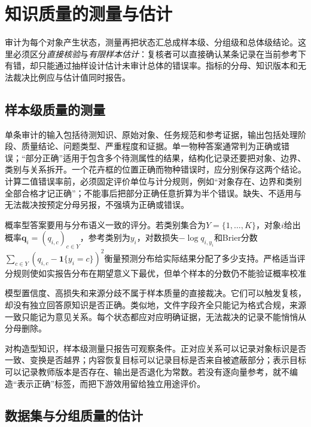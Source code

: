\section{知识质量的测量与估计}
\label{sec:knowledge-quality-assessment-correction-measurement}

审计为每个对象产生状态，测量再把状态汇总成样本级、分组级和总体级结论。这里必须区分\emph{直接核验}与\emph{有限样本估计}：复核者可以直接确认某条记录在当前参考下有错，却只能通过抽样设计估计未审计总体的错误率。指标的分母、知识版本和无法裁决比例应与估计值同时报告。

\subsection{样本级质量的测量}
\label{sec:knowledge-quality-assessment-correction-item-measurement}

单条审计的输入包括待测知识、原始对象、任务规范和参考证据，输出包括处理阶段、质量结论、问题类型、严重程度和证据。单一物种答案通常判为正确或错误；“部分正确”适用于包含多个待测属性的结果，结构化记录还要把对象、边界、类别与关系拆开。一个花卉框的位置正确而物种错误时，应分别保存这两个结论。计算二值错误率前，必须固定评价单位与计分规则，例如“对象存在、边界和类别全部合格才记正确”；不能事后把部分正确任意折算为半个错误。缺失、不适用与无法裁决按预定分母另报，不强填为正确或错误。

概率型答案要用与分布语义一致的评分。若类别集合为$Y=\{1,\ldots,K\}$，对象$i$给出概率$\bm{q}_i=(q_{i,c})_{c\in Y}$，参考类别为$y_i$，对数损失$-\log q_{i,y_i}$和Brier分数$\sum_{c\in Y}(q_{i,c}-\mathbf{1}\{y_i=c\})^2$衡量预测分布给实际结果分配了多少支持。严格适当评分规则使如实报告分布在期望意义下最优，但单个样本的分数仍不能验证概率校准

模型置信度、高损失和来源分歧不属于样本质量的直接裁决。它们可以触发复核，却没有独立回答原知识是否正确。类似地，文件字段齐全只能记为格式合规，来源一致只能记为意见关系。每个状态都应对应明确证据，无法裁决的记录不能悄悄从分母删除。

对构造型知识，样本级测量只报告可观察条件。正对应关系可以记录对象标识是否一致、变换是否越界；内容恢复目标可以记录目标是否来自被遮蔽部分；表示目标可以记录教师版本是否存在、输出是否退化为常数。若没有逐向量参考，就不编造“表示正确”标签，而把下游效用留给独立用途评价。

\subsection{数据集与分组质量的估计}
\label{sec:knowledge-quality-assessment-correction-dataset-estimation}

